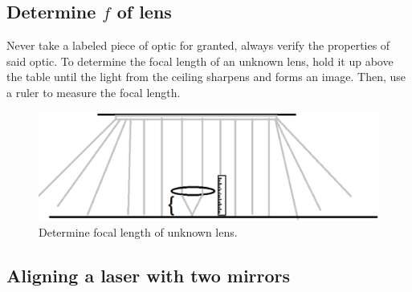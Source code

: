 \documentclass{article}
\begin{document}
\subsection{Determine $f$ of lens}
Never take a labeled piece of optic for granted, always verify the properties of said optic.
To determine the focal length of an unknown lens, hold it up above the table until the light from the ceiling sharpens and forms an image. Then, use a ruler to measure the focal length.
\begin{figure}[!phtb]
    \centering
    \includegraphics[width=0.5\linewidth]{img/Ceiling.eps}
    \caption{Determine focal length of unknown lens.}
    \label{fig:focallength}
\end{figure}
\subsection{Aligning a laser with two mirrors}

\newpage

\printbibliography[heading=bibintoc]
\end{document}

